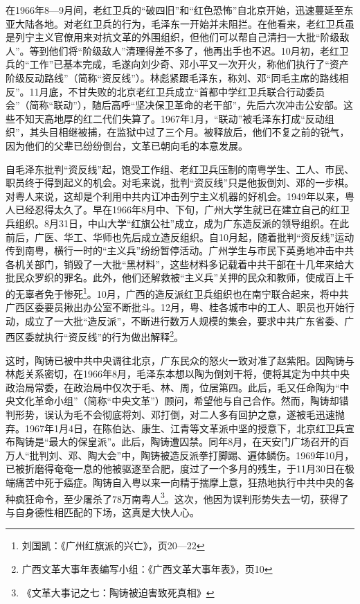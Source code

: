 在1966年8—9月间，老红卫兵的“破四旧”和“红色恐怖”自北京开始，迅速蔓延至东亚大陆各地。对老红卫兵的行为，毛泽东一开始并未阻拦。在他看来，老红卫兵虽是列宁主义官僚用来对抗文革的外围组织，但他们可以帮自己清扫一大批“阶级敌人”。等到他们将“阶级敌人”清理得差不多了，他再出手也不迟。10月初，老红卫兵的“工作”已基本完成，毛遂向刘少奇、邓小平又一次开火，称他们执行了“资产阶级反动路线”（简称“资反线”）。林彪紧跟毛泽东，称刘、邓“同毛主席的路线相反”。11月底，不甘失败的北京老红卫兵成立“首都中学红卫兵联合行动委员会”（简称“联动”），随后高呼“坚决保卫革命的老干部”，先后六次冲击公安部。这些不知天高地厚的红二代们失算了。1967年1月，“联动”被毛泽东打成“反动组织”，其头目相继被捕，在监狱中过了三个月。被释放后，他们不复之前的锐气，因为他们的父辈已纷纷倒台，文革已朝向毛的本意发展。

自毛泽东批判“资反线”起，饱受工作组、老红卫兵压制的南粤学生、工人、市民、职员终于得到起义的机会。对毛来说，批判“资反线”只是他扳倒刘、邓的一步棋。对粤人来说，这却是个利用中共内讧冲击列宁主义机器的好机会。1949年以来，粤人已经忍得太久了。早在1966年8月中、下旬，广州大学生就已在建立自己的红卫兵组织。8月31日，中山大学“红旗公社”成立，成为广东造反派的领导组织。在此前后，广医、华工、华师也先后成立造反组织。自10月起，随着批判“资反线”运动传到南粤，横行一时的“主义兵”纷纷暂停活动。广州学生与市民下英勇地冲击中共各机关部门，销毁了一大批“黑材料”，这些材料多记载着中共干部在十几年来给大批民众罗织的罪名。此外，他们还解救被“主义兵”关押的民众和教师，使成百上千的无辜者免于惨死\footnote{刘国凯：《广州红旗派的兴亡》，页20—22}。10月，广西的造反派红卫兵组织也在南宁联合起来，将中共广西区委要员揪出办公室不断批斗。12月，粤、桂各城市中的工人、职员也开始行动，成立了一大批“造反派”，不断进行数万人规模的集会，要求中共广东省委、广西区委就执行“资反线”的行为做出解释\footnote{广西文革大事年表编写小组：《广西文革大事年表》，页10}。

这时，陶铸已被中共中央调往北京，广东民众的怒火一致对准了赵紫阳。因陶铸与林彪关系密切，在1966年8月，毛泽东本想以陶为倒刘干将，便将其定为中共中央政治局常委，在政治局中仅次于毛、林、周，位居第四。此后，毛又任命陶为“中央文化革命小组”（简称“中央文革”）顾问，希望他与自己合作。然而，陶铸却错判形势，误认为毛不会彻底将刘、邓打倒，对二人多有回护之意，遂被毛迅速抛弃。1967年1月4日，在陈伯达、康生、江青等文革派中坚的授意下，北京红卫兵宣布陶铸是“最大的保皇派”。此后，陶铸遭囚禁。同年8月，在天安门广场召开的百万人“批判刘、邓、陶大会”中，陶铸被造反派拳打脚踢、遍体鳞伤。1969年10月，已被折磨得奄奄一息的他被驱逐至合肥，度过了一个多月的残生，于11月30日在极端痛苦中死于癌症。陶铸自入粤以来一向精于揣摩上意，狂热地执行中共中央的各种疯狂命令，至少屠杀了78万南粤人\footnote{《文革大事记之七：陶铸被迫害致死真相》}。这次，他因为误判形势失去一切，获得了与自身德性相匹配的下场，这真是大快人心。

